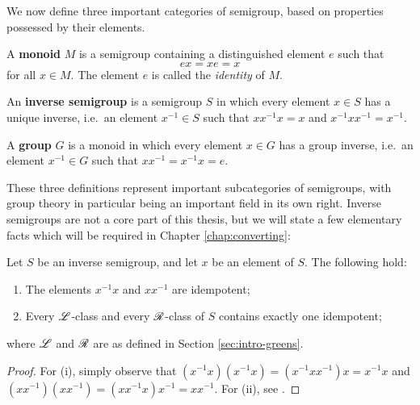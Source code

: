 We now define three important categories of semigroup, based on properties
possessed by their elements.

\begin{definition}
  \label{def:monoid}
  A \textbf{monoid} $M$ is a semigroup containing a distinguished element $e$
  such that
  $$ex = xe = x$$
  for all $x \in M$.  The element $e$ is called the \textit{identity} of $M$.
\end{definition}

\begin{definition}
  \label{def:inverse-semigroup}
  An \textbf{inverse semigroup} is a semigroup $S$ in which every element
  $x \in S$ has a unique inverse, i.e.~an element $x^{-1} \in S$ such that
  $xx^{-1}x=x$ and $x^{-1}xx^{-1}=x^{-1}$.
\end{definition}

\begin{definition}
  \label{def:group}
  A \textbf{group} $G$ is a monoid in which every element $x \in G$ has a
  group inverse, i.e.~an element $x^{-1} \in G$ such that $xx^{-1}=x^{-1}x = e$.
\end{definition}

These three definitions represent important subcategories of semigroups, with
group theory in particular being an important field in its own right.  Inverse
semigroups are not a core part of this thesis, but we will state a few
elementary facts which will be required in Chapter \ref{chap:converting}:

\begin{proposition}
  \label{prop:inverse-semigroup-facts}
  Let $S$ be an inverse semigroup, and let $x$ be an element of $S$.  The
  following hold:
  \begin{enumerate}[\rm(i)]
  \item The elements $x^{-1}x$ and $xx^{-1}$ are idempotent;
  \item Every $\mathrel{\mathscr{L}}$-class and every $\mathrel{\mathscr{R}}$-class of $S$ contains exactly one
    idempotent;
  \end{enumerate}
  where $\mathrel{\mathscr{L}}$ and $\mathrel{\mathscr{R}}$ are as defined in Section \ref{sec:intro-greens}.
  \begin{proof}
    For (i), simply observe that $(x^{-1}x)(x^{-1}x)=(x^{-1}xx^{-1})x = x^{-1}x$
    and $(xx^{-1})(xx^{-1})=(xx^{-1}x)x^{-1} = xx^{-1}$.  For (ii), see
    \cite[Theorem 5.1.1]{howie}.
  \end{proof}
\end{proposition}

